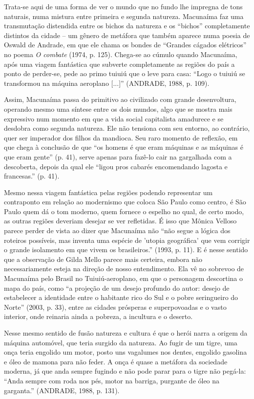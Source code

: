 Trata-se aqui de uma forma de ver o mundo que no fundo lhe impregna de
tons naturais, numa mistura entre primeira e segunda natureza. Macunaíma
faz uma transmutação distendida entre os bichos da natureza e os
``bichos'' completamente distintos da cidade -- um gênero de metáfora
que também aparece numa poesia de Oswald de Andrade, em que ele chama os
bondes de ``Grandes cágados elétricos'' no poema \emph{O combate} (1974,
p. 125). Chega-se ao cúmulo quando Macunaíma, após uma viagem fantástica
que subverte completamente as regiões do país a ponto de perder-se, pede
ao primo tuiuiú que o leve para casa: ``Logo o tuiuiú se transformou na
máquina aeroplano {[}...{]}'' (ANDRADE, 1988, p. 109).

Assim, Macunaíma passa do primitivo ao civilizado com grande
desenvoltura, operando mesmo uma síntese entre os dois mundos, algo que
se mostra mais expressivo num momento em que a vida social capitalista
amadurece e se desdobra como segunda natureza. Ele não tensiona com seu
entorno, ao contrário, quer ser imperador dos filhos da mandioca. Seu
raro momento de reflexão, em que chega à conclusão de que ``os homens é
que eram máquinas e as máquinas é que eram gente'' (p. 41), serve apenas
para fazê-lo cair na gargalhada com a descoberta, depois da qual ele
``ligou pros cabarés encomendando lagosta e francesas.'' (p. 41).

Mesmo nessa viagem fantástica pelas regiões podendo representar um
contraponto em relação ao modernismo que coloca São Paulo como centro, é
São Paulo quem dá o tom moderno, quem fornece o espelho no qual, de
certo modo, as outras regiões deveriam desejar se ver refletidas. É isso
que Mônica Velloso parece perder de vista ao dizer que Macunaíma não
``não segue a lógica dos roteiros possíveis, mas inventa uma espécie de
'utopia geográfica' que vem corrigir o grande isolamento em que vivem os
brasileiros.'' (1993, p. 11). E é nesse sentido que a observação de
Gilda Mello parece mais certeira, embora não necessariamente esteja na
direção de nosso entendimento. Ela vê no sobrevoo de Macunaíma pelo
Brasil no Tuiuiú-aeroplano, em que o personagem descortina o mapa do
país, como ``a projeção de um desejo profundo do autor: desejo de
estabelecer a identidade entre o habitante rico do Sul e o pobre
seringueiro do Norte'' (2003, p. 33), entre as cidades prósperas e
superpovoadas e o vasto interior, onde reinaria ainda a pobreza, a
incultura e o deserto.

Nesse mesmo sentido de fusão natureza e cultura é que o herói narra a
origem da máquina automóvel, que teria surgido da natureza. Ao fugir de
um tigre, uma onça teria engolido um motor, posto uns vagalumes nos
dentes, engolido gasolina e óleo de mamona para não feder. A onça é
quase a metáfora da sociedade moderna, já que anda sempre fugindo e não
pode parar para o tigre não pegá-la: ``Anda sempre com roda nos pés,
motor na barriga, purgante de óleo na garganta.'' (ANDRADE, 1988, p.
131).


